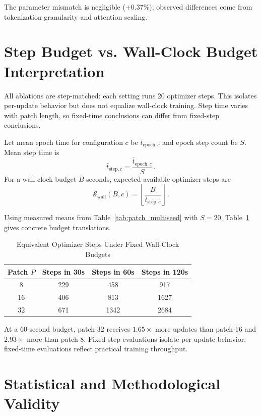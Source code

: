 \documentclass[journal]{IEEEtran}
\begin{document}
The parameter mismatch is negligible (+0.37\%); observed differences come from tokenization granularity and attention scaling.

\section{Step Budget vs. Wall-Clock Budget Interpretation}
All ablations are step-matched: each setting runs 20 optimizer steps. This isolates per-update behavior but does not equalize wall-clock training. Step time varies with patch length, so fixed-time conclusions can differ from fixed-step conclusions.

Let mean epoch time for configuration $c$ be $\bar{t}_{\text{epoch},c}$ and epoch step count be $S$. Mean step time is
\begin{equation}
\bar{t}_{\text{step},c} = \frac{\bar{t}_{\text{epoch},c}}{S}\,.
\label{eq:step_time}
\end{equation}
For a wall-clock budget $B$ seconds, expected available optimizer steps are
\begin{equation}
\mathcal{S}_{\text{wall}}(B,c) = \left\lfloor\frac{B}{\bar{t}_{\text{step},c}}\right\rfloor\,.
\label{eq:wall_steps}
\end{equation}

Using measured means from Table~\ref{tab:patch_multiseed} with $S=20$, Table~\ref{tab:wallclock_steps} gives concrete budget translations.

\begin{table}[t]
\caption{Equivalent Optimizer Steps Under Fixed Wall-Clock Budgets}
\label{tab:wallclock_steps}
\centering
\begin{tabular}{cccc}
\toprule
Patch $P$ & Steps in 30s & Steps in 60s & Steps in 120s \\
\midrule
8  & 229 & 458  & 917  \\
16 & 406 & 813  & 1627 \\
32 & 671 & 1342 & 2684 \\
\bottomrule
\end{tabular}
\end{table}

At a 60-second budget, patch-32 receives $1.65\times$ more updates than patch-16 and $2.93\times$ more than patch-8. Fixed-step evaluations isolate per-update behavior; fixed-time evaluations reflect practical training throughput.

\section{Statistical and Methodological Validity}
\end{document}
